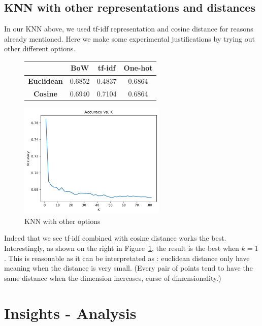 \documentclass{article}
\begin{document}
\subsection{KNN with other representations and distances}

In our KNN above, we used tf-idf representation and cosine distance for reasons already mentioned.
Here we make some experimental justifications by trying out other different options.

\begin{figure}[H]
  \centering
  \begin{minipage}{0.49\textwidth}
  \begin{tabular}{|c|c|c|c|}
  \hline
  & \textbf{BoW} & \textbf{tf-idf} & \textbf{One-hot} \\ \hline
  \textbf{Euclidean} & 0.6852 & 0.4837 & 0.6864 \\ \hline
  \textbf{Cosine} & 0.6940 & 0.7104 & 0.6864 \\ \hline
  \end{tabular}
  \end{minipage}
  \begin{minipage}{0.49\textwidth}
  \includegraphics[width=7cm]{accuracy_plot.png}
  \end{minipage}
  \caption{KNN with other options}
  \label{otherknn}
\end{figure}

Indeed that we see tf-idf combined with cosine distance works the best. Interestingly,
as shown on the right in Figure~\ref{otherknn}, the result is the best when $k=1$.
This is reasonable as it can be interpretated as : euclidean distance only have meaning when
the distance is very small. (Every pair of points tend to have the same distance when the dimension
increases, curse of dimensionality.)

\section{Insights - Analysis}
\end{document}
